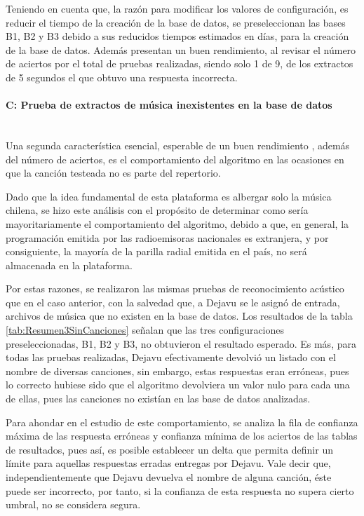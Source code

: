 Teniendo en cuenta que, la razón para modificar los valores de configuración, es reducir el tiempo de la creación de la base de datos, se preseleccionan las bases B1, B2 y B3 debido a sus reducidos tiempos estimados en días, para la creación de la base de datos. Además presentan un buen rendimiento, al revisar el número de aciertos por el total de pruebas realizadas, siendo solo 1 de 9, de los extractos de 5 segundos el que obtuvo una respuesta incorrecta. 

\paragraph{C: Prueba de extractos de música inexistentes en la base de datos}\label{parrrafoPrubasNoMusica}\mbox{}\\

Una segunda característica esencial, esperable de un buen rendimiento , además del número de aciertos, es el comportamiento del algoritmo en las ocasiones en que la canción testeada no es parte del repertorio.

Dado que la idea fundamental de esta plataforma es albergar solo la música chilena, se hizo este análisis con el propósito de determinar como sería mayoritariamente el comportamiento del algoritmo, debido a que, en general, la programación emitida por las radioemisoras nacionales es extranjera, y por consiguiente, la mayoría de la parilla radial emitida en el país, no será almacenada en la plataforma.

Por estas razones, se realizaron las mismas pruebas de reconocimiento acústico que en el caso anterior, con la salvedad que, a Dejavu se le asignó de entrada, archivos de música que no existen en la base de datos. Los resultados de la tabla \ref{tab:Resumen3SinCanciones} señalan que las tres configuraciones preseleccionadas, B1, B2 y B3, no obtuvieron el resultado esperado. Es más, para todas las pruebas realizadas, Dejavu efectivamente devolvió un listado con el nombre de diversas canciones, sin embargo, estas respuestas eran erróneas, pues lo correcto hubiese sido que el algoritmo devolviera un valor nulo para cada una de ellas, pues las canciones no existían en las base de datos analizadas.

Para ahondar en el estudio de este comportamiento, se analiza la fila de confianza máxima de las respuesta erróneas y confianza mínima de los aciertos de las tablas de resultados, pues así, es posible establecer un delta que permita definir un límite para aquellas respuestas erradas entregas por Dejavu. Vale decir que, independientemente que Dejavu devuelva el nombre de alguna canción, éste puede ser incorrecto, por tanto, si la confianza de esta respuesta no supera cierto umbral, no se considera segura.

